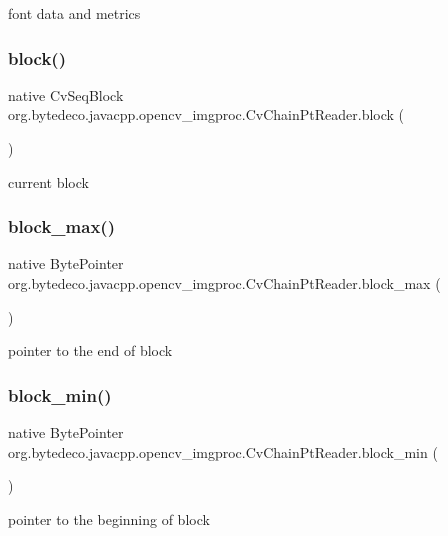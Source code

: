 font data and metrics \mbox{\label{group__imgproc_ga1c4f79fc49a25477fc78d53b3b321e13}} 
\subsubsection{\texorpdfstring{block()}{block()}}
{\footnotesize\ttfamily native Cv\+Seq\+Block org.\+bytedeco.\+javacpp.\+opencv\+\_\+imgproc.\+Cv\+Chain\+Pt\+Reader.\+block (\begin{DoxyParamCaption}{ }\end{DoxyParamCaption})}

current block \mbox{\label{group__imgproc_ga8ac948c1c8f720d6b5082ad1bf147d92}} 
\subsubsection{\texorpdfstring{block\+\_\+max()}{block\_max()}}
{\footnotesize\ttfamily native Byte\+Pointer org.\+bytedeco.\+javacpp.\+opencv\+\_\+imgproc.\+Cv\+Chain\+Pt\+Reader.\+block\+\_\+max (\begin{DoxyParamCaption}{ }\end{DoxyParamCaption})}

pointer to the end of block \mbox{\label{group__imgproc_ga59c7fe18e76ef40cdc54d800e1d38524}} 
\subsubsection{\texorpdfstring{block\+\_\+min()}{block\_min()}}
{\footnotesize\ttfamily native Byte\+Pointer org.\+bytedeco.\+javacpp.\+opencv\+\_\+imgproc.\+Cv\+Chain\+Pt\+Reader.\+block\+\_\+min (\begin{DoxyParamCaption}{ }\end{DoxyParamCaption})}

pointer to the beginning of block \mbox{\label{group__imgproc_ga088af9aa661b76b4381a4635c06ec8c8}} 
